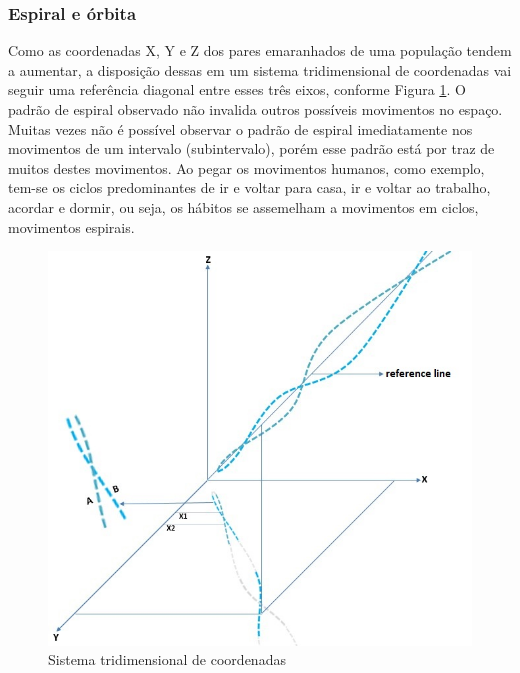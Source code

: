 \subsubsection{Espiral e órbita}
Como as coordenadas X, Y e Z dos pares emaranhados de uma população tendem a aumentar, a disposição dessas em um sistema tridimensional de coordenadas vai seguir uma referência diagonal entre esses três eixos, conforme Figura \ref{fig:consciousness_space_spiral_reference_line}. O padrão de espiral observado não invalida outros possíveis movimentos no espaço. Muitas vezes não é possível observar o padrão de espiral imediatamente nos movimentos de um intervalo (subintervalo), porém esse padrão está por traz de muitos destes movimentos. Ao pegar os movimentos humanos, como exemplo, tem-se os ciclos predominantes de ir e voltar para casa, ir e voltar ao trabalho, acordar e dormir, ou seja, os hábitos se assemelham a movimentos em ciclos, movimentos espirais.
	\begin{figure}[H]
	\caption{Sistema tridimensional de coordenadas}
	\label{fig:consciousness_space_spiral_reference_line}
	\centering
	\includegraphics[scale=.7]{sections/images/consciousness_space_spiral_reference_line.jpg}
	\end{figure}

